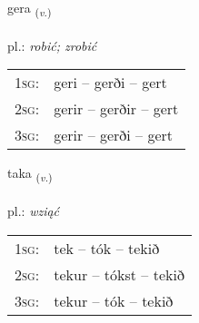 \documentclass[frontgrid, backgrid]{flacards}\usepackage[]{graphicx}\usepackage[]{xcolor}
\begin{document}
{gera \small{\textsubscript{(\textit{v.})}} \\[1ex] %
\textphonetic{[cɛːra]} \\
pl.: \emph{robić; zrobić} \\  [2ex]
\renewcommand*{\arraystretch}{0.8}
\begin{tabular}{p{1cm}l}
\textsc{1sg}: & geri -- gerði -- gert \\ 
\textsc{2sg}: & gerir -- gerðir -- gert \\ 
\textsc{3sg}: & gerir -- gerði -- gert \\ 
\end{tabular}
}

\renewcommand{\flhead}{\vskip5pt \fboxsep=0pt {\small\bfseries\footnotesize Sagnorð | czasownik}}
\renewcommand{\fcfoot}{\vskip5pt \fboxsep=0pt \hspace{2pt}{\small\bfseries\footnotesize 1K}}

\renewcommand{\blhead}{\vskip5pt {\small\bfseries\footnotesize Sagnorð | czasownik }}
\renewcommand{\bcfoot}{\vskip5pt \hspace{2pt}{\small\bfseries\footnotesize 1K}}


{taka \small{\textsubscript{(\textit{v.})}} \\[1ex] %
\textphonetic{[tʰaːka]} \\
pl.: \emph{wziąć} \\  [2ex]
\renewcommand*{\arraystretch}{0.8}
\begin{tabular}{p{1cm}l}
\textsc{1sg}: & tek -- tók -- tekið \\ 
\textsc{2sg}: & tekur -- tókst -- tekið \\ 
\textsc{3sg}: & tekur -- tók -- tekið \\ 
\end{tabular}
}


\renewcommand{\flhead}{\vskip5pt \fboxsep=0pt {\small\bfseries\footnotesize Samtenging | spójnik}}
\renewcommand{\fcfoot}{\vskip5pt \fboxsep=0pt \hspace{2pt}{\small\bfseries\footnotesize 1K}}
\end{document}
